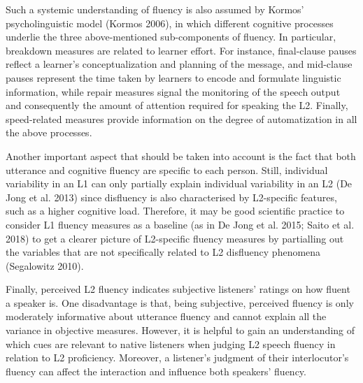\begin{styleStandard}
Such a systemic understanding of fluency is also assumed by Kormos’ psycholinguistic model (Kormos 2006), in which different cognitive processes underlie the three above-mentioned sub-components of fluency. In particular, breakdown measures are related to learner effort. For instance, final-clause pauses reflect a learner’s conceptualization and planning of the message, and mid-clause pauses represent the time taken by learners to encode and formulate linguistic information, while repair measures signal the monitoring of the speech output and consequently the amount of attention required for speaking the L2. Finally, speed-related measures provide information on the degree of automatization in all the above processes.
\end{styleStandard}

\begin{styleStandard}
Another important aspect that should be taken into account is the fact that both utterance and cognitive fluency are specific to each person. Still, individual variability in an L1 can only partially explain individual variability in an L2 (De Jong et al. 2013) since disfluency is also characterised by L2-specific features, such as a higher cognitive load. Therefore, it may be good scientific practice to consider L1 fluency measures as a baseline (as in De Jong et al. 2015; Saito et al. 2018) to get a clearer picture of L2-specific fluency measures by partialling out the variables that are not specifically related to L2 disfluency phenomena (Segalowitz 2010).
\end{styleStandard}

\begin{styleStandard}
Finally, perceived L2 fluency indicates subjective listeners’ ratings on how fluent a speaker is. One disadvantage is that, being subjective, perceived fluency is only moderately informative about utterance fluency and cannot explain all the variance in objective measures. However, it is helpful to gain an understanding of which cues are relevant to native listeners when judging L2 speech fluency in relation to L2 proficiency. Moreover, a listener’s judgment of their interlocutor’s fluency can affect the interaction and influence both speakers’ fluency.
\end{styleStandard}

